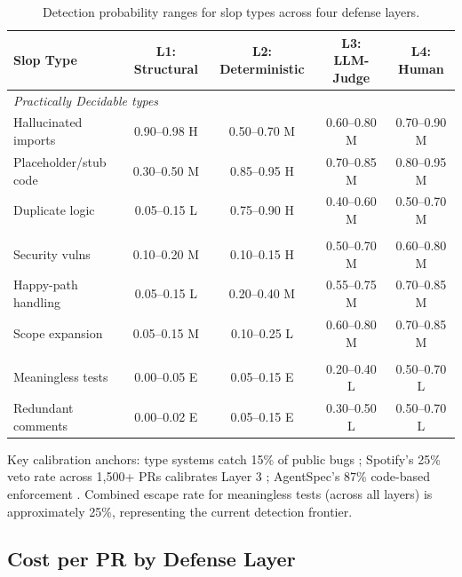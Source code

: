 \documentclass[11pt, a4paper, copyright]{googledeepmind}
\begin{document}
\begin{table}[htbp]
\centering
\caption{Detection probability ranges for slop types across four defense layers.}
\label{tab:detection}
\small
\begin{tabular}{@{}l c c c c@{}}
\toprule
\textbf{Slop Type} & \textbf{L1: Structural} & \textbf{L2: Deterministic} & \textbf{L3: LLM-Judge} & \textbf{L4: Human} \\
\midrule
\multicolumn{5}{l}{\textit{Practically Decidable types}} \\
\addlinespace
Hallucinated imports & 0.90--0.98 H & 0.50--0.70 M & 0.60--0.80 M & 0.70--0.90 M \\
Placeholder/stub code & 0.30--0.50 M & 0.85--0.95 H & 0.70--0.85 M & 0.80--0.95 M \\
Duplicate logic & 0.05--0.15 L & 0.75--0.90 H & 0.40--0.60 M & 0.50--0.70 M \\
\addlinespace
\multicolumn{5}{l}{\textit{Partially Detectable types}} \\
\addlinespace
Security vulns & 0.10--0.20 M & 0.10--0.15 H & 0.50--0.70 M & 0.60--0.80 M \\
Happy-path handling & 0.05--0.15 L & 0.20--0.40 M & 0.55--0.75 M & 0.70--0.85 M \\
Scope expansion & 0.05--0.15 M & 0.10--0.25 L & 0.60--0.80 M & 0.70--0.85 M \\
\addlinespace
\multicolumn{5}{l}{\textit{Reliably Undetectable types}} \\
\addlinespace
Meaningless tests & 0.00--0.05 E & 0.05--0.15 E & 0.20--0.40 L & 0.50--0.70 L \\
Redundant comments & 0.00--0.02 E & 0.05--0.15 E & 0.30--0.50 L & 0.50--0.70 L \\
\bottomrule
\end{tabular}
\end{table}

Key calibration anchors: type systems catch 15\% of public bugs \citep{gao2017}; Spotify's 25\% veto rate across 1,500+ PRs calibrates Layer 3 \citep{spotify2025}; AgentSpec's 87\% code-based enforcement \citep{wang2026agentspec}. Combined escape rate for meaningless tests (across all layers) is approximately 25\%, representing the current detection frontier.

\subsection{Cost per PR by Defense Layer}
\end{document}
